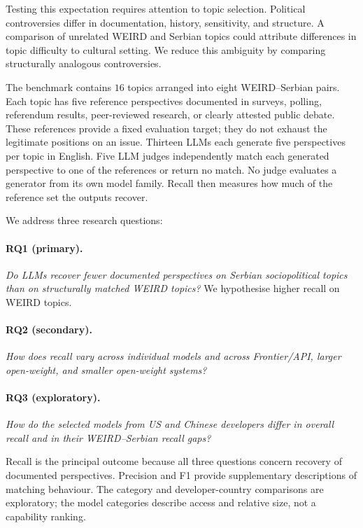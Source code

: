 \documentclass[11pt,a4paper]{article}
\begin{document}
Testing this expectation requires attention to topic selection. Political controversies differ in documentation, history, sensitivity, and structure. A comparison of unrelated WEIRD and Serbian topics could attribute differences in topic difficulty to cultural setting. We reduce this ambiguity by comparing structurally analogous controversies.

The benchmark contains $16$ topics arranged into eight WEIRD--Serbian pairs. Each topic has five reference perspectives documented in surveys, polling, referendum results, peer-reviewed research, or clearly attested public debate. These references provide a fixed evaluation target; they do not exhaust the legitimate positions on an issue. Thirteen LLMs each generate five perspectives per topic in English. Five LLM judges independently match each generated perspective to one of the references or return no match. No judge evaluates a generator from its own model family. Recall then measures how much of the reference set the outputs recover.

We address three research questions:

\paragraph{RQ1 (primary).}
\textit{Do LLMs recover fewer documented perspectives on Serbian sociopolitical topics than on structurally matched WEIRD topics?} We hypothesise higher recall on WEIRD topics.

\paragraph{RQ2 (secondary).}
\textit{How does recall vary across individual models and across Frontier/API, larger open-weight, and smaller open-weight systems?}

\paragraph{RQ3 (exploratory).}
\textit{How do the selected models from US and Chinese developers differ in overall recall and in their WEIRD--Serbian recall gaps?}

Recall is the principal outcome because all three questions concern recovery of documented perspectives. Precision and F1 provide supplementary descriptions of matching behaviour. The category and developer-country comparisons are exploratory; the model categories describe access and relative size, not a capability ranking.
\end{document}

